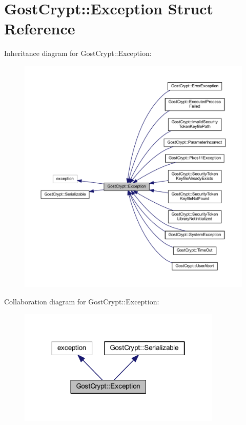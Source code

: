 \hypertarget{struct_gost_crypt_1_1_exception}{}\section{Gost\+Crypt\+:\+:Exception Struct Reference}
\label{struct_gost_crypt_1_1_exception}


Inheritance diagram for Gost\+Crypt\+:\+:Exception\+:
\nopagebreak
\begin{figure}[H]
\begin{center}
\leavevmode
\includegraphics[width=350pt]{struct_gost_crypt_1_1_exception__inherit__graph}
\end{center}
\end{figure}


Collaboration diagram for Gost\+Crypt\+:\+:Exception\+:
\nopagebreak
\begin{figure}[H]
\begin{center}
\leavevmode
\includegraphics[width=274pt]{struct_gost_crypt_1_1_exception__coll__graph}
\end{center}
\end{figure}
